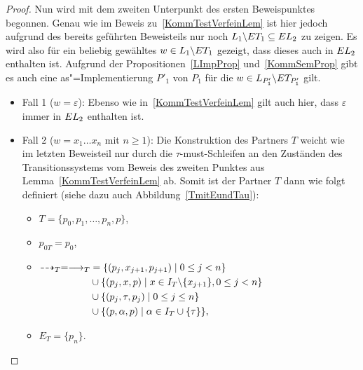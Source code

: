 \begin{proof}
  Nun wird mit dem zweiten Unterpunkt des ersten Beweispunktes begonnen. Genau
  wie im Beweis zu~\ref{KommTestVerfeinLem} ist hier jedoch aufgrund des
  bereits geführten Beweisteils nur noch $L_1\backslash ET _1\subseteq EL _2$
  zu zeigen. Es wird also für ein beliebig gewähltes $w\in L_1\backslash ET _1$
  gezeigt, dass dieses auch in $EL _2$ enthalten ist. Aufgrund der
  Propositionen~\ref{LImpProp} und~\ref{KommSemProp} gibt es auch eine
  as"=Implementierung $P'_1$ von $P_1$ für die $w\in L_{P'_1}\backslash ET
  _{P'_1}$ gilt.
  \begin{itemize}
    \item Fall 1 ($w=\varepsilon$): Ebenso wie in~\ref{KommTestVerfeinLem} gilt
      auch hier, dass $\varepsilon$ immer in $EL _2$ enthalten ist.
    \item Fall 2 ($w=x_1\dots x_n$ mit $n\geq 1$): Die Konstruktion des
      Partners $T$ weicht wie im letzten Beweisteil nur durch die
      $\tau$-must-Schleifen an den Zuständen des Transitionssystems vom Beweis
      des zweiten Punktes aus Lemma~\ref{KommTestVerfeinLem} ab. Somit ist der
      Partner $T$ dann wie folgt definiert (siehe dazu auch
      Abbildung~\ref{TmitEundTau}):
      \begin{itemize}
        \item $T=\{p_0,p_1,\dots ,p_n,p\}$,
        \item $p_{0T}=p_0$,
        \item $\begin{aligned}[t]
            \may _T = \must _T&=\{(p_j,x_{j+1},p_{j+1})\mid 0\leq j< n\}\\
            &\cup\{(p_j,x,p)\mid x\in I_T\backslash\{x_{j+1}\},0\leq j < n\}\\
            &\cup\{(p_j,\tau ,p_j)\mid 0\leq j\leq n\}\\
            &\cup\{(p,\alpha ,p)\mid \alpha\in I_T\cup \{\tau\}\},
              \end{aligned}$
        \item $E_T=\{p_n\}$.
      \end{itemize}
      \begin{figure} [h!tbp]
      \begin{center}
\end{center}
\end{figure}
\end{itemize}
\end{proof}
